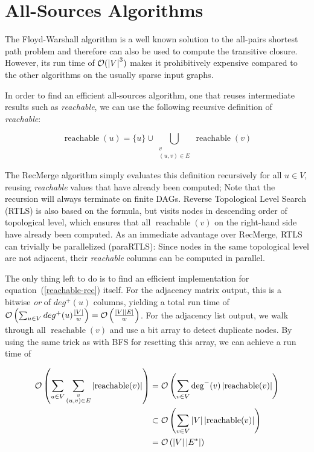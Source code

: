 \documentclass[12pt,a4paper,twoside]{article}
\DeclareMathOperator*{\reachable}{reachable}
\begin{document}
\section{All-Sources Algorithms}

The Floyd-Warshall algorithm is a well known solution to the all-pairs shortest path problem and therefore can also be used to compute the transitive closure. However, its run time of $\mathcal{O}(\left|V\right|^3)$ makes it prohibitively expensive compared to the other algorithms on the usually sparse input graphs.

In order to find an efficient all-sources algorithm, \eg one that reuses intermediate results such as \emph{reachable}, we can use the following recursive definition of \emph{reachable}:

\begin{equation}
  \reachable(u) = \{u\} \cup \bigcup_{\substack{v \\ (u, v) \in E}} \reachable(v)
  \label{reachable-rec}
\end{equation}

The RecMerge algorithm simply evaluates this definition recursively for all $u \in V$, reusing \emph{reachable} values that have already been computed; Note that the recursion will always terminate on finite DAGs. Reverse Topological Level Search (RTLS) is also based on the formula, but visits nodes in descending order of topological level, which ensures that all $\reachable(v)$ on the right-hand side have already been computed. As an immediate advantage over RecMerge, RTLS can trivially be parallelized (paraRTLS): Since nodes in the same topological level are not adjacent, their \emph{reachable} columns can be computed in parallel.

The only thing left to do is to find an efficient implementation for equation~(\ref{reachable-rec}) itself. For the adjacency matrix output, this is a bitwise \emph{or} of $deg^+(u)$ columns, yielding a total run time of $\mathcal{O}\left(\sum_{u \in V} deg^+(u) \frac{\left|V\right|}{w}\right) = \mathcal{O}\left(\frac{\left|V\right| \left|E\right|}{w}\right)$. For the adjacency list output, we walk through all $\reachable(v)$ and use a bit array to detect duplicate nodes. By using the same trick as with BFS for resetting this array, we can achieve a run time of

\begin{align*}
\BigOh{\sum_{u \in V} \sum_{\substack{v \\ (u, v) \in E}} \abs{\reachable(v)}}
&= \BigOh{\sum_{v \in V} \deg^-(v) \abs{\reachable(v)}} \\
&\subset \BigOh{\sum_{v \in V} \abs{V} \abs{\reachable(v)}} \\
&= \BigOh{\abs{V} \abs{E^*}}
\end{align*}
\end{document}
